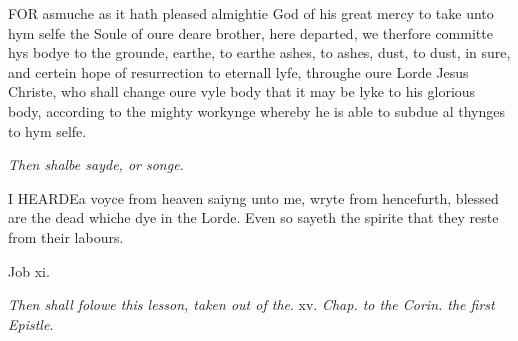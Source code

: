 FOR
asmuche as it hath pleased almightie God of his great mercy to take unto
hym selfe the Soule of oure deare brother, here departed, we therfore
committe hys bodye to the grounde, earthe, to earthe ashes, to ashes,
dust, to dust, in sure, and certein hope of resurrection to eternall lyfe,
throughe oure Lorde Jesus Christe, who shall change oure vyle body that
it may be lyke to his glorious body, according to the mighty workynge
whereby he is able to subdue al thynges to hym selfe.

\emph{Then
shalbe sayde, or songe.}

I
HEARDE\textbf{}a voyce from heaven saiyng unto me, wryte from hencefurth,
blessed are the dead whiche dye in the Lorde. Even so sayeth the spirite
that they reste from their labours.

Job
xi.

\emph{Then
shall folowe this lesson, taken out of the}. xv. \emph{Chap. to the Corin.
the first Epistle.}

